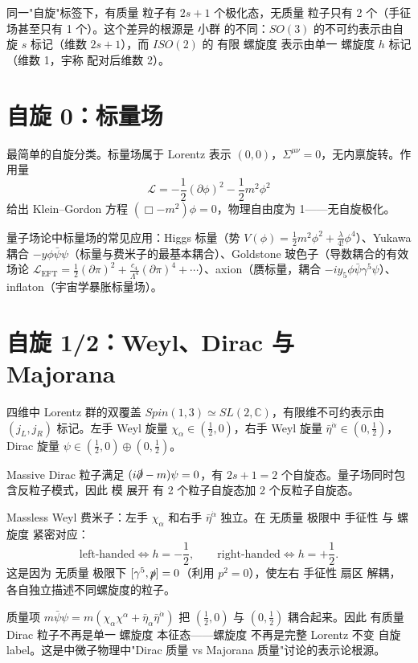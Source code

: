 同一"自旋"标签下，有质量 粒子有 $2s+1$ 个极化态，无质量 粒子只有 2 个（手征场甚至只有 1 个）。这个差异的根源是 小群 的不同：$SO(3)$ 的不可约表示由自旋 $s$ 标记（维数 $2s+1$），而 $ISO(2)$ 的 有限 螺旋度 表示由单一 螺旋度 $h$ 标记（维数 1，宇称 配对后维数 2）。

\section{自旋 0：标量场}

最简单的自旋分类。标量场属于 Lorentz 表示 $(0,0)$，$\Sigma^{\mu\nu}=0$，无内禀旋转。作用量
\begin{equation}
\mathcal{L}=-\frac{1}{2}(\partial\phi)^2-\frac{1}{2}m^2\phi^2
\end{equation}
给出 Klein--Gordon 方程 $(\Box-m^2)\phi=0$，物理自由度为 1——无自旋极化。

量子场论中标量场的常见应用：Higgs 标量（势 $V(\phi)=\frac{1}{2}m^2\phi^2+\frac{\lambda}{4!}\phi^4$）、Yukawa 耦合 $-y\phi\bar\psi\psi$（标量与费米子的最基本耦合）、Goldstone 玻色子（导数耦合的有效场论 $\mathcal{L}_{\text{EFT}}=\frac{1}{2}(\partial\pi)^2+\frac{c_4}{\Lambda^4}(\partial\pi)^4+\cdots$）、axion（赝标量，耦合 $-iy_5\phi\bar\psi\gamma^5\psi$）、inflaton（宇宙学暴胀标量场）。

\section{自旋 1/2：Weyl、Dirac 与 Majorana}

四维中 Lorentz 群的双覆盖 $Spin(1,3)\simeq SL(2,\mathbb{C})$，有限维不可约表示由 $(j_L,j_R)$ 标记。左手 Weyl 旋量 $\chi_\alpha\in(\frac{1}{2},0)$，右手 Weyl 旋量 $\bar\eta^{\dot\alpha}\in(0,\frac{1}{2})$，Dirac 旋量 $\psi\in(\frac{1}{2},0)\oplus(0,\frac{1}{2})$。

Massive Dirac 粒子满足 $(i\slashed\partial-m)\psi=0$，有 $2s+1=2$ 个自旋态。量子场同时包含反粒子模式，因此 模 展开 有 2 个粒子自旋态加 2 个反粒子自旋态。

Massless Weyl 费米子：左手 $\chi_\alpha$ 和右手 $\bar\eta^{\dot\alpha}$ 独立。在 无质量 极限中 手征性 与 螺旋度 紧密对应：
\begin{equation}
\text{left-handed}\Leftrightarrow h=-\frac{1}{2},\qquad \text{right-handed}\Leftrightarrow h=+\frac{1}{2}.
\end{equation}
这是因为 无质量 极限下 $[\gamma^5,\slashed p]=0$（利用 $p^2=0$），使左右 手征性 扇区 解耦，各自独立描述不同螺旋度的粒子。

质量项 $m\bar\psi\psi=m(\chi_\alpha\chi^\alpha+\bar\eta_{\dot\alpha}\bar\eta^{\dot\alpha})$ 把 $(\frac{1}{2},0)$ 与 $(0,\frac{1}{2})$ 耦合起来。因此 有质量 Dirac 粒子不再是单一 螺旋度 本征态——螺旋度 不再是完整 Lorentz 不变 自旋 label。这是中微子物理中"Dirac 质量 vs Majorana 质量"讨论的表示论根源。

